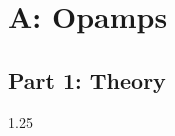 \section{A: Opamps }
\label{sec:chap_1}
\subsection{Part 1: Theory}


\begin{spacing}{1.25}


\end{spacing}


